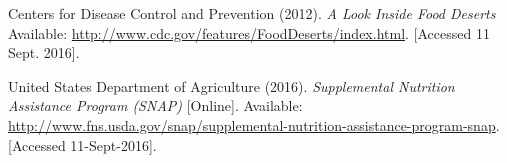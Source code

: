 \documentclass[12pt]{article}
\begin{document}
\pagebreak

\begin{thebibliography}{9}
    Centers for Disease Control and Prevention (2012).
    \textit{A Look Inside Food Deserts}
    Available: \url{http://www.cdc.gov/features/FoodDeserts/index.html}.
    [Accessed 11 Sept. 2016].

    United States Department of Agriculture (2016).
    \textit{Supplemental Nutrition Assistance Program (SNAP)} [Online].
    Available: \url{http://www.fns.usda.gov/snap/supplemental-nutrition-assistance-program-snap}.
    [Accessed 11-Sept-2016].
\end{thebibliography}

\printbibliography
\end{document}
